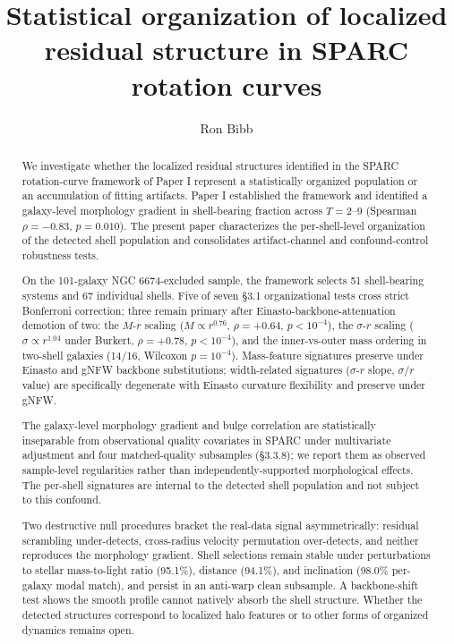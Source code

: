 \documentclass[linenumbers,trackchanges]{aastex701}
\begin{document}
\title{Statistical organization of localized residual structure in SPARC rotation curves}

\author[orcid=0009-0004-1153-2464,sname=Bibb,gname=Ron]{Ron Bibb}

\begin{abstract}
We investigate whether the localized residual structures identified in the SPARC rotation-curve framework of Paper I represent a statistically organized population or an accumulation of fitting artifacts. Paper I established the framework and identified a galaxy-level morphology gradient in shell-bearing fraction across $T = 2$--9 (Spearman $\rho = -0.83$, $p = 0.010$). The present paper characterizes the per-shell-level organization of the detected shell population and consolidates artifact-channel and confound-control robustness tests.

On the 101-galaxy NGC 6674-excluded sample, the framework selects 51 shell-bearing systems and 67 individual shells. Five of seven \S3.1 organizational tests cross strict Bonferroni correction; three remain primary after Einasto-backbone-attenuation demotion of two: the $M$-$r$ scaling ($M \propto r^{0.76}$, $\rho = +0.64$, $p < 10^{-4}$), the $\sigma$-$r$ scaling ($\sigma \propto r^{1.04}$ under Burkert, $\rho = +0.78$, $p < 10^{-4}$), and the inner-vs-outer mass ordering in two-shell galaxies (14/16, Wilcoxon $p = 10^{-4}$). Mass-feature signatures preserve under Einasto and gNFW backbone substitutions; width-related signatures ($\sigma$-$r$ slope, $\sigma/r$ value) are specifically degenerate with Einasto curvature flexibility and preserve under gNFW.

The galaxy-level morphology gradient and bulge correlation are statistically inseparable from observational quality covariates in SPARC under multivariate adjustment and four matched-quality subsamples (\S3.3.8); we report them as observed sample-level regularities rather than independently-supported morphological effects. The per-shell signatures are internal to the detected shell population and not subject to this confound.

Two destructive null procedures bracket the real-data signal asymmetrically: residual scrambling under-detects, cross-radius velocity permutation over-detects, and neither reproduces the morphology gradient. Shell selections remain stable under perturbations to stellar mass-to-light ratio (95.1\%), distance (94.1\%), and inclination (98.0\% per-galaxy modal match), and persist in an anti-warp clean subsample. A backbone-shift test shows the smooth profile cannot natively absorb the shell structure. Whether the detected structures correspond to localized halo features or to other forms of organized dynamics remains open.

\end{abstract}
\end{document}

